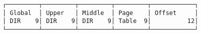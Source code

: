 \documentclass[varwidth=35em]{standalone}
\begin{document}
\begin{verbatim}
┌─────────┬─────────┬─────────┬─────────┬────────────┐
│ Global  │ Upper   │ Middle  │ Page    │ Offset     │
│ DIR    9│ DIR    9│ DIR    9│ Table  9│          12│
└─────────┴─────────┴─────────┴─────────┴────────────┘
\end{verbatim}
\end{document}
